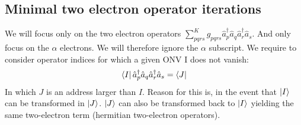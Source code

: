 %
%
%
%
%
%
%
%

\subsection{Minimal two electron operator iterations}

We will focus only on the two electron operators $ \sum_{pqrs}^K g_{pqrs} \hat{a}^{\dagger}_{p} \hat{a}_{q}  \hat{a}^{\dagger}_{r} \hat{a}_{s}$. And only focus on the $\alpha$ electrons. We will therefore ignore the $\alpha$ subscript.
We require to consider operator indices for which a given ONV I does not vanish:
\begin{equation} \label{eq:address}
  \bra{I} \hat{a}^{\dagger}_{p} \hat{a}_{q} \hat{a}^{\dagger}_{r} \hat{a}_{s} = \bra{J}
\end{equation}
In which $J$ is an address larger than $I$. Reason for this is, in the event that $\ket{I}$ can be transformed in $\ket{J}$. $\ket{J}$ can also be transformed back to $\ket{I}$ yielding the same two-electron term (hermitian two-electron operators).

